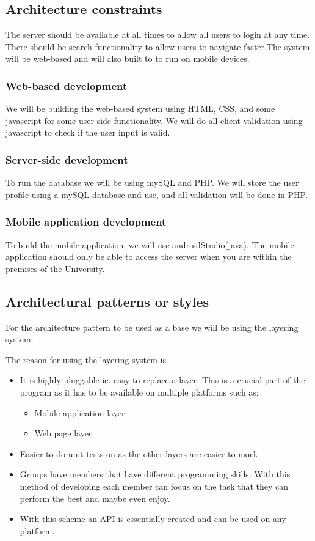 \documentclass[a4paper,12pt]{report}
\begin{document}
\subsection{Architecture constraints}

The server should be available at all times to allow all users to login at any time. There should be search functionality to allow users to navigate faster.The system will be web-based and will also built to to run on mobile devices.

\subsubsection{Web-based development}

We will be building the web-based system using HTML, CSS, and some javascript for some user side functionality. We will do all client validation using javascript to check if the user input is valid.  

\subsubsection{Server-side development}

To run the database we will be using mySQL and PHP. We will store the user profile using a mySQL database and use, and all validation will be done in PHP.


\subsubsection{Mobile application development}

To build the mobile application, we will use androidStudio(java). The mobile application should only be able to access the server when you are within the premises of the University.

\subsection{Architectural patterns or styles}
For the architecture pattern to be used as a base we will be using the layering system.

The reason for using the layering system is
\begin{itemize}
	\item It is highly pluggable ie. easy to replace a layer. This is a crucial part of the program as it has to be available on multiple platforms such as:
	\begin{itemize}
		\item Mobile application layer
		\item Web page layer
	\end{itemize}
	\item Easier to do unit tests on as the other layers are easier to mock
	\item Groups have members that have different programming skills. With this method of developing each member can focus on the task that they can perform the best and maybe even enjoy.
	\item With this scheme an API is essentially created and can be used on any platform. 
\end{itemize}
\end{document}
